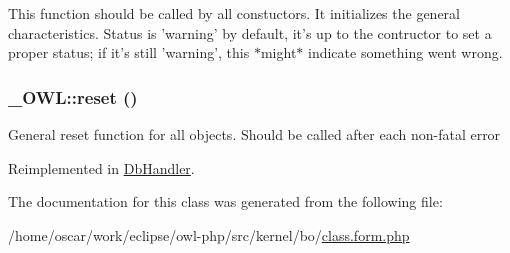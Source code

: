 This function should be called by all constuctors. It initializes the general characteristics. Status is 'warning' by default, it's up to the contructor to set a proper status; if it's still 'warning', this $\ast$might$\ast$ indicate something went wrong. \hypertarget{class__OWL_2f2a042bcf31965194c03033df0edc9b}{
\subsubsection{\setlength{\rightskip}{0pt plus 5cm}\_\-OWL::reset ()}}
\label{class__OWL_2f2a042bcf31965194c03033df0edc9b}


General reset function for all objects. Should be called after each non-fatal error 

Reimplemented in \hyperlink{classDbHandler_9982df4830f05803935bb31bac7fae3d}{DbHandler}.

The documentation for this class was generated from the following file:\begin{CompactItemize}
\item 
/home/oscar/work/eclipse/owl-php/src/kernel/bo/\hyperlink{class_8form_8php}{class.form.php}\end{CompactItemize}
